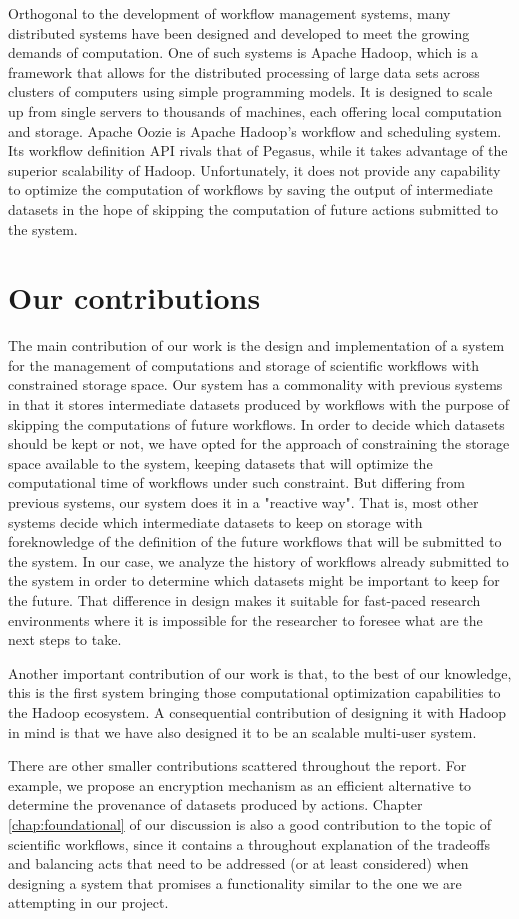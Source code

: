 Orthogonal to the development of workflow management systems, many distributed systems have been designed and developed to meet the growing demands of computation.  One of such systems is Apache Hadoop, which is a framework that allows for the distributed processing of large data sets across clusters of computers using simple programming models. It is designed to scale up from single servers to thousands of machines, each offering local computation and storage. Apache Oozie\cite{islam2012oozie} is Apache Hadoop's workflow and scheduling system.  Its workflow definition API rivals that of Pegasus, while it takes advantage of the superior scalability of Hadoop. Unfortunately, it does not provide any capability to optimize the computation of workflows by saving the output of intermediate datasets in the hope of skipping the computation of future actions submitted to the system.

\section{Our contributions}
The main contribution of our work is the design and implementation of a system for the management of computations and storage of scientific workflows with constrained storage space. Our system has a commonality with previous systems in that it stores intermediate datasets produced by workflows with the purpose of skipping the computations of future workflows.  In order to decide which datasets should be kept or not, we have opted for the  approach of constraining the storage space available to the system, keeping datasets that will optimize the computational time of workflows under such constraint. But differing from previous systems, our system does it in a "reactive way".  That is, most other systems decide which intermediate datasets to keep on storage with foreknowledge of the definition of the future workflows that will be submitted to the system.  In our case, we analyze the history of workflows already submitted to the system in order to determine which datasets might be important to keep for the future. That difference in design makes it suitable for fast-paced research environments where it is impossible for the researcher to foresee what are the next steps to take.

Another important contribution of our work is that, to the best of our knowledge, this is the first system bringing those computational optimization capabilities to the Hadoop ecosystem.  A consequential contribution of designing it with Hadoop in mind is that we have also designed it to be an scalable multi-user system.

There are other smaller contributions scattered throughout the report. For example, we propose an encryption mechanism as an efficient alternative to determine the provenance of datasets produced by actions.  Chapter \ref{chap:foundational} of our discussion is also a good contribution to the topic of scientific workflows, since it contains a throughout explanation of the tradeoffs and balancing acts that need to be addressed (or at least considered) when designing a system that promises a functionality similar to the one we are attempting in our project. 